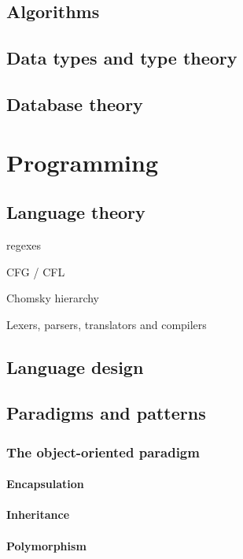 \documentclass{report}
\begin{document}
\chapter{Algorithms}


\chapter{Data types and type theory}


\chapter{Database theory}

\part{Programming}
\setcounter{chapter}{0} %

\chapter{Language theory}

regexes

CFG / CFL

Chomsky hierarchy

Lexers, parsers, translators and compilers
\chapter{Language design}


\chapter{Paradigms and patterns}
\section{The object-oriented paradigm}
\subsection{Encapsulation}
\subsection{Inheritance}
\subsection{Polymorphism}
\end{document}
